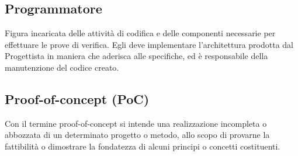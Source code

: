 	\subsection{Programmatore} 
		Figura incaricata delle attività di codifica e delle componenti necessarie per effettuare le prove di verifica. Egli deve implementare l’architettura prodotta dal Progettista in maniera che aderisca alle specifiche, ed è responsabile della manutenzione del codice creato.
	\subsection{Proof-of-concept (PoC) }  
		Con il termine proof-of-concept si intende una realizzazione incompleta o abbozzata di un determinato progetto o metodo, allo scopo di provarne la fattibilità o dimostrare la fondatezza di alcuni principi o concetti costituenti.





\newpage